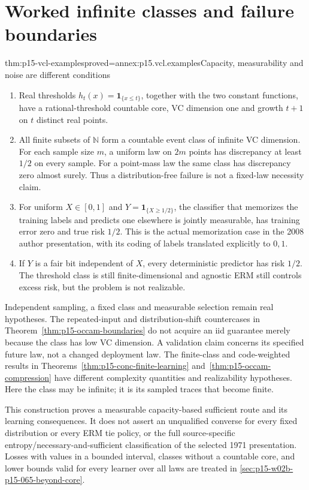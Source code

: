 \section{Worked infinite classes and failure boundaries}
\label{sec:p15-vcl-examples}

\begin{hbtheorem}{thm:p15-vcl-examples}{proved=annex:p15.vcl.examples}{Capacity, measurability and noise are different conditions}
\begin{enumerate}
\item Real thresholds \(h_t(x)=\mathbf1_{\{x\leq t\}}\), together
with the two constant functions, have a rational-threshold countable core,
VC dimension one and growth \(t+1\) on \(t\) distinct real points.
\item All finite subsets of \(\mathbb N\) form a countable event class
of infinite VC dimension. For each sample size \(m\), a uniform law on
\(2m\) points has discrepancy at least \(1/2\) on every sample.
For a point-mass law the same class has discrepancy zero almost surely.
Thus a distribution-free failure is not a fixed-law necessity claim.
\item For uniform \(X\in[0,1]\) and \(Y=\mathbf1_{\{X\geq1/2\}}\),
the classifier that memorizes the training labels and predicts one elsewhere
is jointly measurable, has training error zero and true risk \(1/2\).
This is the actual memorization case in the 2008 author presentation,
with its coding of labels translated explicitly to \(0,1\).
\item If \(Y\) is a fair bit independent of \(X\), every deterministic
predictor has risk \(1/2\). The threshold class is still finite-dimensional
and agnostic ERM still controls excess risk, but the problem is not realizable.
\end{enumerate}
\end{hbtheorem}

Independent sampling, a fixed class and measurable selection remain real
hypotheses. The repeated-input and distribution-shift countercases in
Theorem~\ref{thm:p15-occam-boundaries} do not acquire an iid guarantee merely
because the class has low VC dimension. A validation claim concerns its
specified future law, not a changed deployment law.
The finite-class and code-weighted results in
Theorems~\ref{thm:p15-conc-finite-learning} and~\ref{thm:p15-occam-compression}
have different complexity quantities and realizability hypotheses.
Here the class may be infinite; it is its sampled traces that become finite.

This construction proves a measurable capacity-based sufficient route and
its learning consequences. It does not assert an unqualified converse for
every fixed distribution or every ERM tie policy, or the full
source-specific entropy/necessary-and-sufficient classification of the
selected 1971 presentation. Losses with values in a bounded interval,
classes without a countable core, and lower bounds valid for every learner
over all laws are treated in \cref{sec:p15-w02b-p15-065-beyond-core}.
